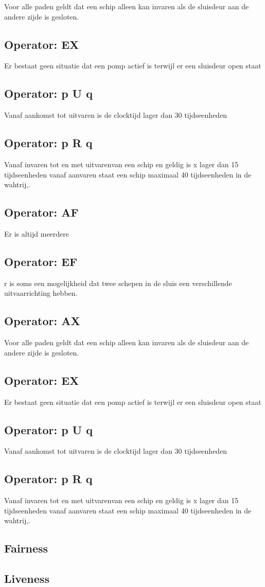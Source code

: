 \documentclass{article}
\begin{document}
	Voor alle paden geldt dat een schip alleen kan invaren als de sluisdeur aan de andere zijde is gesloten.
	\subsection{Operator: EX}
	Er bestaat geen situatie dat een pomp actief is terwijl er een sluisdeur open staat
	\subsection{Operator: p U q}
	Vanaf aankomst tot uitvaren is de clocktijd lager dan 30 tijdseenheden 
	\subsection{Operator: p R q}
	Vanaf invaren tot en met uitvarenvan een schip en geldig is x lager dan 15 tijdseenheden
	vanaf aanvaren staat een schip maximaal 40 tijdseenheden in de wahtrij,.

	\subsection{Operator: AF}
	Er is altijd meerdere
	\subsection{Operator: EF}
	r is soms een mogelijkheid dat twee schepen in de sluis een verschillende uitvaarrichting hebben.
	\subsection{Operator: AX}
	Voor alle paden geldt dat een schip alleen kan invaren als de sluisdeur aan de andere zijde is gesloten.
	\subsection{Operator: EX}
	Er bestaat geen situatie dat een pomp actief is terwijl er een sluisdeur open staat
	\subsection{Operator: p U q}
	Vanaf aankomst tot uitvaren is de clocktijd lager dan 30 tijdseenheden 
	\subsection{Operator: p R q}
	Vanaf invaren tot en met uitvarenvan een schip en geldig is x lager dan 15 tijdseenheden
	vanaf aanvaren staat een schip maximaal 40 tijdseenheden in de wahtrij,.

	\subsection{Fairness}
	
	\subsection{Liveness}
	
 
	
	\newpage
	
	
\end{document}
